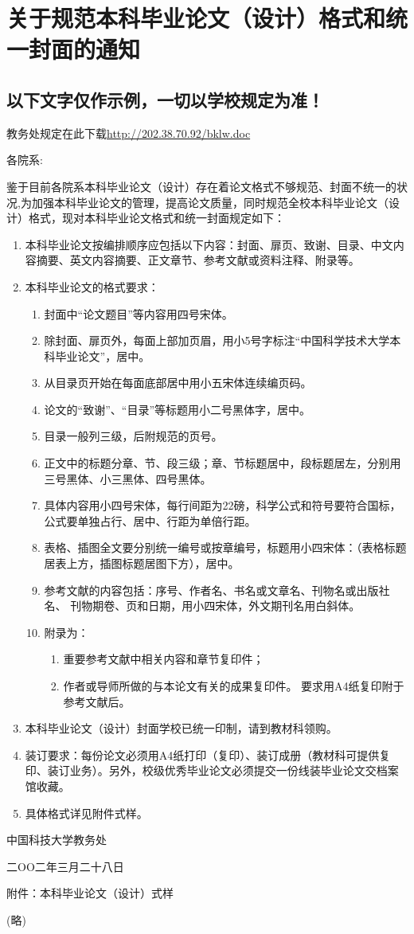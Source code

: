 ﻿
\chapter*{关于规范本科毕业论文（设计）格式和统一封面的通知}
\section*{以下文字仅作示例，一切以学校规定为准！}
教务处规定在此下载\url{http://202.38.70.92/bklw.doc}

\hspace{-2em}各院系:

鉴于目前各院系本科毕业论文（设计）存在着论文格式不够规范、封面不统一的状况,为加强本科毕业论文的管理，提高论文质量，同时规范全校本科毕业论文（设计）格式，现对本科毕业论文格式和统一封面规定如下：
\begin{enumerate}
\item 本科毕业论文按编排顺序应包括以下内容：封面、扉页、致谢、目录、中文内容摘要、英文内容摘要、正文章节、参考文献或资料注释、附录等。
\item 本科毕业论文的格式要求：
\begin{enumerate}
\item 封面中“论文题目”等内容用四号宋体。
\item 除封面、扉页外，每面上部加页眉，用小5号字标注“中国科学技术大学本科毕业论文”，居中。
\item 从目录页开始在每面底部居中用小五宋体连续编页码。
\item 论文的“致谢”、“目录”等标题用小二号黑体字，居中。
\item 目录一般列三级，后附规范的页号。
\item 正文中的标题分章、节、段三级；章、节标题居中，段标题居左，分别用三号黑体、小三黑体、四号黑体。
\item 具体内容用小四号宋体，每行间距为22磅，科学公式和符号要符合国标，公式要单独占行、居中、行距为单倍行距。
\item 表格、插图全文要分别统一编号或按章编号，标题用小四宋体：（表格标题居表上方，插图标题居图下方），居中。
\item 参考文献的内容包括：序号、作者名、书名或文章名、刊物名或出版社名、
刊物期卷、页和日期，用小四宋体，外文期刊名用白斜体。
\item 附录为：
\begin{enumerate}
\item 重要参考文献中相关内容和章节复印件；
\item 作者或导师所做的与本论文有关的成果复印件。
要求用A4纸复印附于参考文献后。
\end{enumerate}
\end{enumerate}
\item 本科毕业论文（设计）封面学校已统一印制，请到教材科领购。
\item 装订要求：每份论文必须用A4纸打印（复印）、装订成册（教材科可提供复印、装订业务）。另外，校级优秀毕业论文必须提交一份线装毕业论文交档案馆收藏。
\item 具体格式详见附件式样。
\end{enumerate}
\begin{flushright}
中国科技大学教务处

二OO二年三月二十八日
\end{flushright}
附件：本科毕业论文（设计）式样

(略)
